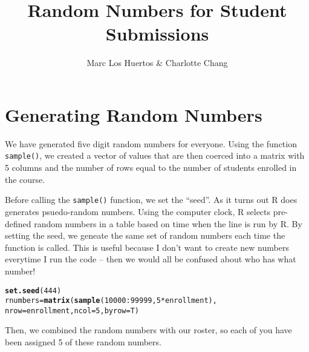\documentclass{article}\usepackage[]{graphicx}\usepackage[]{color}
\title{Random Numbers for Student Submissions}
\author{Marc Los Huertos \& Charlotte Chang}
\makeatletter
\newcommand{\hlnum}[1]{\textcolor[rgb]{0.686,0.059,0.569}{#1}}%
\newcommand{\hlopt}[1]{\textcolor[rgb]{0,0,0}{#1}}%
\newcommand{\hlstd}[1]{\textcolor[rgb]{0.345,0.345,0.345}{#1}}%
\newcommand{\hlkwb}[1]{\textcolor[rgb]{0.69,0.353,0.396}{#1}}%
\newcommand{\hlkwc}[1]{\textcolor[rgb]{0.333,0.667,0.333}{#1}}%
\newcommand{\hlkwd}[1]{\textcolor[rgb]{0.737,0.353,0.396}{\textbf{#1}}}%
\newenvironment{kframe}{%
 \def\at@end@of@kframe{}%
 \ifinner\ifhmode%
  \def\at@end@of@kframe{\end{minipage}}%
  \begin{minipage}{\columnwidth}%
 \fi\fi%
 \def\FrameCommand##1{\hskip\@totalleftmargin \hskip-\fboxsep
 \colorbox{shadecolor}{##1}\hskip-\fboxsep
     \hskip-\linewidth \hskip-\@totalleftmargin \hskip\columnwidth}%
 \MakeFramed {\advance\hsize-\width
   \@totalleftmargin\z@ \linewidth\hsize
   \@setminipage}}%
 {\par\unskip\endMakeFramed%
 \at@end@of@kframe}
\newenvironment{knitrout}{}{} %
\makeatother
\begin{document}
\maketitle


\section*{Generating Random Numbers}

We have generated five digit random numbers for everyone. Using the function \texttt{sample()}, we created a vector of values that are then coerced into a matrix with 5 columns and the number of rows equal to the number of students enrolled in the course. 

Before calling the \texttt{sample()} function, we set the ``seed''. As it turns out R does generates psuedo-random numbers. Using the computer clock, R selects pre-defined random numbers in a table based on time when the line is run by R. By setting the seed, we geneate the same set of random numbers each time the function is called. This is useful because I don't want to create new numbers everytime I run the code -- then we would all be confused about who has what number!

\begin{knitrout}
\color{fgcolor}\begin{kframe}
\begin{alltt}
\hlkwd{set.seed}\hlstd{(}\hlnum{444}\hlstd{)}
\hlstd{rnumbers} \hlkwb{=} \hlkwd{matrix}\hlstd{(}\hlkwd{sample}\hlstd{(}\hlnum{10000}\hlopt{:}\hlnum{99999}\hlstd{,} \hlnum{5}\hlopt{*} \hlstd{enrollment),}
          \hlkwc{nrow}\hlstd{=enrollment,} \hlkwc{ncol}\hlstd{=}\hlnum{5}\hlstd{,} \hlkwc{byrow}\hlstd{=T)}
\end{alltt}
\end{kframe}
\end{knitrout}

Then, we combined the random numbers with our roster, so each of you have been assigned 5 of these random numbers. 
\end{document}
